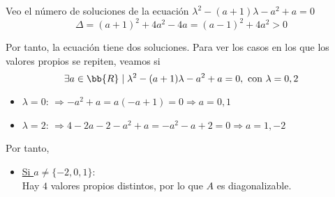 \begin{ejercicio}
    Veo el número de soluciones de la ecuación $\lambda^2-(a+1)\lambda-a^2+a = 0$
    \begin{equation*}
        \Delta = (a+1)^2 +4a^2-4a = (a-1)^2+4a^2 > 0
    \end{equation*}
    
    Por tanto, la ecuación tiene dos soluciones. Para ver los casos en los que los valores propios se repiten, veamos si $$\exists a\in \bb{R} \mid \lambda^2-(a+1)\lambda-a^2+a = 0, \text{ con } \lambda=0,2$$
    \begin{itemize}
        \item \underline{$\lambda=0$}:
        $\Longrightarrow -a^2+a = a(-a+1) = 0 \Longrightarrow a = 0,1$

        \item \underline{$\lambda=2$}:
        $\Longrightarrow 4-2a-2-a^2+a = -a^2-a+2 = 0 \Longrightarrow a = 1,-2$
    \end{itemize}

    Por tanto,
    \begin{itemize}
        \item \underline{Si $a\neq \{-2,0,1\}$}:\\
        Hay $4$ valores propios distintos, por lo que $A$ es diagonalizable.


\end{itemize}
\end{ejercicio}
